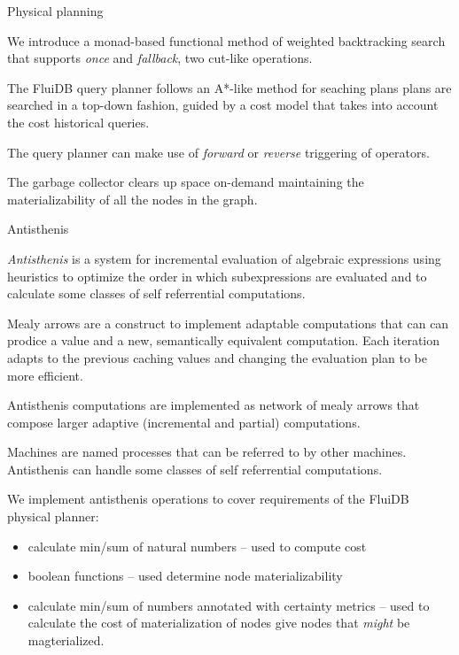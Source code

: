 Physical planning
\begin{summary}
\item We introduce a monad-based functional method of weighted
  backtracking search that supports \emph{once} and \emph{fallback},
  two cut-like operations.
\item The FluiDB query planner follows an A*-like method for seaching plans
  plans are searched in a top-down fashion, guided by a cost model that
  takes into account the cost historical queries.
\item The query planner can make use of \emph{forward} or
  \emph{reverse} triggering of operators.
\item The garbage collector clears up space on-demand maintaining the
  materializability of all the nodes in the graph.
\end{summary}


Antisthenis
\begin{summary}
\item \emph{Antisthenis} is a system for incremental evaluation of
  algebraic expressions using heuristics to optimize the order in
  which subexpressions are evaluated and to calculate some classes of
  self referrential computations.
\item Mealy arrows are a construct to implement adaptable computations
  that can can prodice a value and a new, semantically equivalent
  computation. Each iteration adapts to the previous caching values
  and changing the evaluation plan to be more efficient.
\item Antisthenis computations are implemented as network of mealy
  arrows that compose larger adaptive (incremental and partial)
  computations.
\item Machines are named processes that can be referred to by other
  machines. Antisthenis can handle some classes of self referrential
  computations.
\item We implement antisthenis operations to cover requirements of the
  FluiDB physical planner:

  \begin{itemize}
  \item calculate min/sum of natural numbers -- used to compute cost
  \item boolean functions -- used determine node materializability
  \item calculate min/sum of numbers annotated with certainty metrics
    -- used to calculate the cost of materialization of nodes give
    nodes that \emph{might} be magterialized.
  \end{itemize}
\end{summary}


